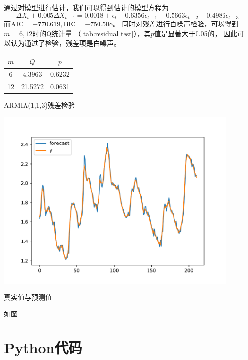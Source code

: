\documentclass[cn]{homework}
\begin{document}
\begin{subproblem}[(\alph*)]
        通过对模型进行估计，我们可以得到估计的模型方程为
        \[\Delta X_t+0.005\Delta X_{t-1}=0.0018+\epsilon_t-0.6356\epsilon_{t-1}
        -0.5663\epsilon_{t-2}-0.4986\epsilon_{t-3}\]
        而$\mathrm{AIC}=-770.619,\mathrm{BIC}=-750.508$。
        同时对残差进行白噪声检验，可以得到$m=6,12$时的Q统计量
        （\cref{tab:residual test}），其$p$值是显著大于0.05的，
        因此可以认为通过了检验，残差项是白噪声。
        \begin{margintable}
            \centering
            \begin{tabular}{ccc}
                \toprule
                $m$ & $Q$ & $p$ \\
                \midrule
                6 & 4.3963 & 0.6232\\
                12 & 21.5272 & 0.0631\\
                \bottomrule
            \end{tabular}
            \caption{ARMIA(1,1,3)残差检验}
            \label{tab:residual test}
        \end{margintable}
        \begin{marginfigure}
            \includegraphics[width=0.9\textwidth]{real-prediction}
            \caption{真实值与预测值}
            \label{fig:residual}
        \end{marginfigure}
        
        \item
        如图
    \end{subproblem}

    \appendix
    \section{Python代码}
    
\end{document}
